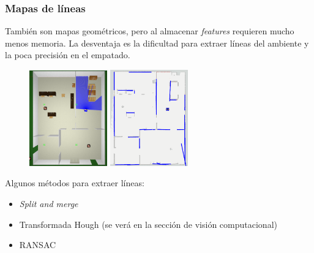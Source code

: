 \begin{frame}\frametitle{Mapas de líneas}
  También son mapas geométricos, pero al almacenar \textit{features} requieren mucho menos memoria. La desventaja es la dificultad para extraer líneas del ambiente y la poca precisión en el empatado. 
  \begin{figure}
    \centering
    \includegraphics[width=0.3\textwidth]{Figures/MapLinesGazebo.png}
    \includegraphics[width=0.3\textwidth]{Figures/MapLines.png}
  \end{figure}
  Algunos métodos para extraer líneas:
  \begin{itemize}
  \item \textit{Split and merge}
  \item Transformada Hough (se verá en la sección de visión computacional)
  \item RANSAC
  \end{itemize}
\end{frame}

